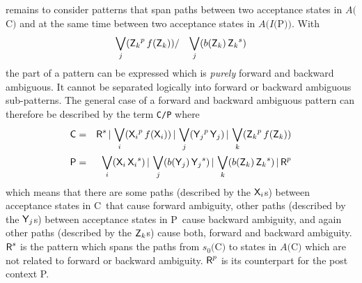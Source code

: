 \documentclass[acmtoplas]{acmtrans2m}
\newcommand{\fa}[1]{$A(${\sf #1}$)$}
\newcommand{\fsz}[1]{$s_0(${\sf #1}$)$}
\newcommand{\finv}[1]{$I(${\sf #1}$)$}
\newcommand{\pP}{{\sf P}}
\newcommand{\pC}{{\sf C}}
\newcommand{\pXi}{$\mbox{\sf X}_i$}
\newcommand{\pYj}{$\mbox{\sf Y}_j$}
\newcommand{\pZk}{$\mbox{\sf Z}_k$}
\newcommand{\mpP}{\mbox{\sf P}}
\newcommand{\mpC}{\mbox{\sf C}}
\newcommand{\corepattern}[1] {\mbox{\sf #1}^p  \,  \mbox{\sf #1}}
\newcommand{\corepatternf}[1]{\mbox{\sf #1}^p  \,f(\mbox{\sf #1})}
\newcommand{\postcontext}[1] {\mbox{\sf #1}    \,  \mbox{\sf #1}^s}
\newcommand{\postcontextb}[1]{b(\mbox{\sf #1}) \,  \mbox{\sf #1}^s}
\begin{document}
remains to consider patterns that span paths between two acceptance states in \fa{C} 
and at the same time between two acceptance states in \fa{\finv{P}}. With 
\begin{eqnarray} \label{pat:fba-pattern}
            \bigvee_j( \corepatternf{\pZk} )  & / & \bigvee_j( \postcontextb{\pZk} )
\end{eqnarray}
the part of a pattern can be expressed which is {\it purely} forward and backward ambiguous.
It cannot be separated logically into forward or backward ambiguous sub-patterns.
The general case of a forward and backward ambiguous pattern can therefore
be described by the term {\tt \pC/\pP} where
\begin{eqnarray}
\mpC & = & 
                \mbox{\sf R}^s 
          \,|\, \bigvee_i( \corepatternf{\pXi} )
          \,|\, \bigvee_j( \corepattern{\pYj}  )
          \,|\, \bigvee_k( \corepatternf{\pZk} )
\\
\mpP & =& 
                \bigvee_i( \postcontext{\pXi} )
          \,|\, \bigvee_j( \postcontextb{\pYj}  )
          \,|\, \bigvee_k( \postcontextb{\pZk} )
          \,|\, \mbox{\sf R}^p
\end{eqnarray}
which means that there are some paths (described by the \pXi{}s) between acceptance states in \pC\ that cause
forward ambiguity, other paths (described by the \pYj{}s) between acceptance states in \pP\ cause backward
ambiguity, and again other paths (described by the \pZk{}s) cause both, forward and backward ambiguity.
$\mbox{\sf R}^s$ is the pattern which spans the paths from \fsz{C} to states in \fa{C} which
are not related to forward or backward ambiguity. $\mbox{\sf R}^p$ is its counterpart for the
post context \pP. 
\end{document}

